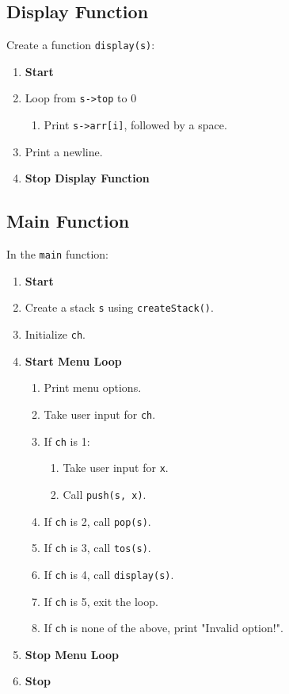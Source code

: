 {  \subsection{Display Function}
  Create a function \texttt{display(s)}:
  \begin{enumerate}[label=\arabic*:]
    \item \textbf{Start}
    \item Loop from \texttt{s->top} to 0
          \begin{enumerate}[label=2.\arabic*:]
            \item Print \texttt{s->arr[i]}, followed by a space.
          \end{enumerate}
    \item Print a newline.
    \item \textbf{Stop Display Function}
  \end{enumerate}

  \subsection{Main Function}
  In the \texttt{main} function:
  \begin{enumerate}[label=\arabic*:, start=1]
    \item \textbf{Start}
    \item Create a stack \texttt{s} using \texttt{createStack()}.
    \item Initialize \texttt{ch}.
    \item \textbf{Start Menu Loop}
          \begin{enumerate}[label=4.\arabic*:, start=1]
            \item Print menu options.
            \item Take user input for \texttt{ch}.
            \item If \texttt{ch} is 1:
                  \begin{enumerate}[label=4.1.\arabic*:, start=1]
                    \item Take user input for \texttt{x}.
                    \item Call \texttt{push(s, x)}.
                  \end{enumerate}
            \item If \texttt{ch} is 2, call \texttt{pop(s)}.
            \item If \texttt{ch} is 3, call \texttt{tos(s)}.
            \item If \texttt{ch} is 4, call \texttt{display(s)}.
            \item If \texttt{ch} is 5, exit the loop.
            \item If \texttt{ch} is none of the above, print "Invalid option!".
          \end{enumerate}
    \item \textbf{Stop Menu Loop}
    \item \textbf{Stop}
  \end{enumerate}
 }



